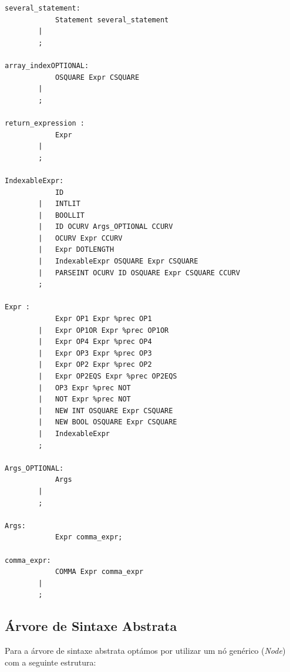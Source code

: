 \documentclass[12pt]{article}
\begin{document}
\begin{lstlisting}
several_statement:
            Statement several_statement     
        |                                       
        ;

array_indexOPTIONAL:
            OSQUARE Expr CSQUARE        
        |                                   
        ;

return_expression : 
            Expr    
        |               
        ;

IndexableExpr: 
            ID                                                  
        |   INTLIT                                              
        |   BOOLLIT                                             
        |   ID OCURV Args_OPTIONAL CCURV                        
        |   OCURV Expr CCURV                                    
        |   Expr DOTLENGTH                                      
        |   IndexableExpr OSQUARE Expr CSQUARE                  
        |   PARSEINT OCURV ID OSQUARE Expr CSQUARE CCURV        
        ;

Expr : 
            Expr OP1 Expr %prec OP1                 
        |   Expr OP1OR Expr %prec OP1OR             
        |   Expr OP4 Expr %prec OP4                 
        |   Expr OP3 Expr %prec OP3                 
        |   Expr OP2 Expr %prec OP2                 
        |   Expr OP2EQS Expr %prec OP2EQS           
        |   OP3 Expr %prec NOT                      
        |   NOT Expr %prec NOT                      
        |   NEW INT OSQUARE Expr CSQUARE            
        |   NEW BOOL OSQUARE Expr CSQUARE           
        |   IndexableExpr                           
        ;

Args_OPTIONAL:
            Args    
        |               
        ;

Args:
            Expr comma_expr;

comma_expr: 
            COMMA Expr comma_expr       
        |                                  
        ;
\end{lstlisting}



\subsection{Árvore de Sintaxe Abstrata}

Para a árvore de sintaxe abstrata optámos por utilizar um nó genérico (\emph{Node}) com a  seguinte estrutura: 
\end{document}
